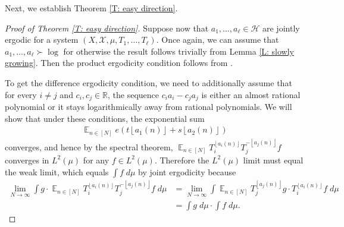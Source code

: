 \documentclass[11pt]{amsart}
\theoremstyle{definition}
\DeclareMathOperator*{\E}{\mathbb{E}}
\newcommand{\R}{{\mathbb R}}
\newcommand{\CH}{{\mathcal H}}
\newcommand{\CX}{{\mathcal X}}
\newcommand{\1}{{\mathbf{1}}}
\newcommand{\floor}[1]{{\left \lfloor #1 \right \rfloor}}
\begin{document}
Next, we establish Theorem \ref{T: easy direction}.
\begin{proof}[Proof of Theorem \ref{T: easy direction}]
    Suppose now that $a_{1},\dots,a_{\ell}\in\CH$ are jointly ergodic for a system $(X, \CX, \mu, T_1, \ldots, T_\ell)$. 
    Once again, we can assume that  $a_1, \ldots, a_\ell\succ \log$ for otherwise the result follows trivially from Lemma \ref{L: slowly growing}. Then the product ergodicity condition follows from \cite[Lemmas 12.6 and 12.13]{DKKST24}.

    To get the difference ergodicity condition, we need to additionally assume that for every $i\neq j$ and $c_i,c_j\in\R$, the sequence $c_i a_i - c_j a_j$ is either an almost rational polynomial or it stays logarithmically away from rational polynomials. We will show that under these conditions, the exponential sum
    \begin{align}\label{E: convergence of exp sum}
        \E_{n\in[N]}e(t\floor{a_1(n)}+s\floor{a_2(n)})
    \end{align}
    converges, and hence by the spectral theorem, $\E_{n\in[N]}T_i^{\floor{a_i(n)}}T_j^{-\floor{a_j(n)}}f$ converges in $L^2(\mu)$ for any $f\in L^2(\mu)$. Therefore the $L^2(\mu)$ limit must equal the weak limit, which equals $\int f\; d\mu$ by joint ergodicity because
    \begin{align*}
        \lim_{N\to\infty}\int g\cdot \E_{n\in[N]}T_i^{\floor{a_i(n)}}T_j^{-\floor{a_j(n)}}f\; d\mu &= \lim_{N\to\infty}\int \E_{n\in[N]} T_j^{\floor{a_j(n)}}g\cdot T_i^{\floor{a_i(n)}}f\; d\mu\\
        &= \int g\; d\mu \cdot \int f\; d\mu.
    \end{align*}


\end{proof}
\end{document}

